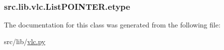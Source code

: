 \subsubsection[{etype}]{\setlength{\rightskip}{0pt plus 5cm}src.\+lib.\+vlc.\+List\+P\+O\+I\+N\+T\+E\+R.\+etype}\label{classsrc_1_1lib_1_1vlc_1_1ListPOINTER_a844ada7c6d6500ba23542f63587c6c32}


The documentation for this class was generated from the following file\+:\begin{DoxyCompactItemize}
\item 
src/lib/\hyperlink{vlc_8py}{vlc.\+py}\end{DoxyCompactItemize}
